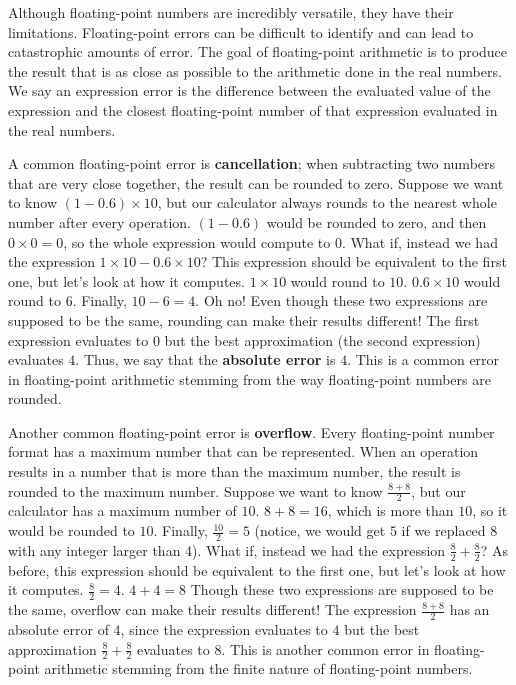 \documentclass[11pt]{article}
\begin{document}
Although floating-point numbers are incredibly versatile, they have their
  limitations.
Floating-point errors can be difficult to identify and can lead to catastrophic
  amounts of error.
The goal of floating-point arithmetic is to produce the result that is as close
  as possible to the arithmetic done in the real numbers.
We say an expression error is the difference between the evaluated value of the
  expression and the closest floating-point number of that expression evaluated
  in the real numbers.


A common floating-point error is \textbf{cancellation}; when subtracting two numbers that are very
  close together, the result can be rounded to zero.
Suppose we want to know $(1 - 0.6) \times 10$, but our calculator always rounds to 
  the nearest whole number after every operation.
$(1 - 0.6)$ would be rounded to zero, and then $0 \times 0 = 0$, so the whole
  expression would compute to $0$.
What if, instead we had the expression $1 \times 10 - 0.6 \times 10$?
This expression should be equivalent to the first one, but let's look at how it computes.
$1 \times 10$ would round to $10$.
$0.6 \times 10$ would round to $6$.
Finally, $10 - 6 = 4$.
Oh no!
Even though these two expressions are supposed to be the same, rounding can make their
  results different!
The first expression evaluates to $0$ but the best approximation (the second expression) evaluates $4$.
Thus, we say that the \textbf{absolute error} is $4$.
This is a common error in floating-point arithmetic stemming from the way
  floating-point numbers are rounded.

Another common floating-point error is \textbf{overflow}.
Every floating-point number format has a maximum number that can be represented.
When an operation results in a number that is more than the maximum number, the result
  is rounded to the maximum number.
Suppose we want to know $\frac{8 + 8}{2}$, but our calculator has a maximum number of $10$.
$8 + 8 = 16$, which is more than $10$, so it would be rounded to $10$.
Finally, $\frac{10}{2} = 5$ (notice, we would get $5$ if we replaced $8$ with any integer larger than $4$).
What if, instead we had the expression $\frac{8}{2} + \frac{8}{2}$?
As before, this expression should be equivalent to the first one, but let's look at how it computes.
$\frac{8}{2} = 4$.
$4 + 4 = 8$ 
Though these two expressions are supposed to be the same, overflow can make their
  results different!
The expression $\frac{8 + 8}{2}$ has an absolute error of $4$, since the expression evaluates to $4$ 
  but the best approximation $\frac{8}{2} + \frac{8}{2}$ evaluates to $8$.
This is another common error in floating-point arithmetic stemming from the finite nature of
  floating-point numbers.
\end{document}
